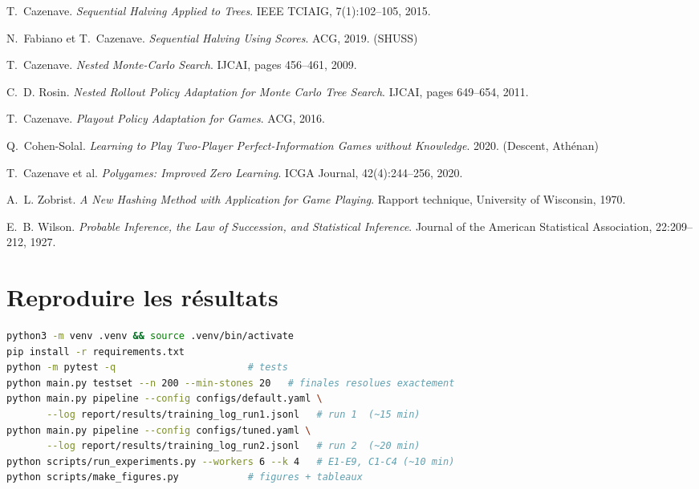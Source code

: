 \documentclass[11pt,a4paper]{article}
\begin{document}
\begin{thebibliography}{99}
 T.~Cazenave.
  \emph{Sequential Halving Applied to Trees}. IEEE TCIAIG, 7(1):102--105, 2015.

 N.~Fabiano et T.~Cazenave.
  \emph{Sequential Halving Using Scores}. ACG, 2019. (SHUSS)

 T.~Cazenave.
  \emph{Nested Monte-Carlo Search}. IJCAI, pages 456--461, 2009.

 C.~D. Rosin.
  \emph{Nested Rollout Policy Adaptation for Monte Carlo Tree Search}.
  IJCAI, pages 649--654, 2011.

 T.~Cazenave.
  \emph{Playout Policy Adaptation for Games}. ACG, 2016.

 Q.~Cohen-Solal.
  \emph{Learning to Play Two-Player Perfect-Information Games without Knowledge}.
  2020. (Descent, Athénan)

 T.~Cazenave et al.
  \emph{Polygames: Improved Zero Learning}. ICGA Journal, 42(4):244--256, 2020.

 A.~L. Zobrist.
  \emph{A New Hashing Method with Application for Game Playing}.
  Rapport technique, University of Wisconsin, 1970.

 E.~B. Wilson.
  \emph{Probable Inference, the Law of Succession, and Statistical Inference}.
  Journal of the American Statistical Association, 22:209--212, 1927.

\end{thebibliography}

\appendix

\section{Reproduire les résultats}
\label{sec:repro}

\begin{lstlisting}[language=bash,caption={Commandes.},numbers=none]
python3 -m venv .venv && source .venv/bin/activate
pip install -r requirements.txt
python -m pytest -q                       # tests
python main.py testset --n 200 --min-stones 20   # finales resolues exactement
python main.py pipeline --config configs/default.yaml \
       --log report/results/training_log_run1.jsonl   # run 1  (~15 min)
python main.py pipeline --config configs/tuned.yaml \
       --log report/results/training_log_run2.jsonl   # run 2  (~20 min)
python scripts/run_experiments.py --workers 6 --k 4   # E1-E9, C1-C4 (~10 min)
python scripts/make_figures.py            # figures + tableaux
\end{lstlisting}
\end{document}
